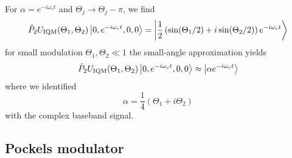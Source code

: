 For $\alpha=e^{-i\omega_ct}$ and $\Theta_j\to\Theta_j-\pi$, we find
\begin{equation}
	\hat{P}_2
	U_\text{IQM}(\Theta_1,\Theta_2)
	\ket{0,e^{-i\omega_ct},0,0}
	=
	\ket{\frac{1}{2}\left(\sin(\Theta_1/2)+i\sin(\Theta_2/2)\right)e^{-i\omega_ct}}
\end{equation}
for small modulation $\Theta_1,\Theta_2\ll1$ the small-angle approximation yields
\begin{equation}
	\hat{P}_2
	U_\text{IQM}(\Theta_1,\Theta_2)
	\ket{0,e^{-i\omega_ct},0,0}
	\approx
	\ket{\alpha e^{-i\omega_ct}}
\end{equation}
where we identified
\begin{equation}
	\alpha
	=
	\frac{1}{4}
	\left(\Theta_1+i\Theta_2\right)
\end{equation}
with the complex baseband signal.


\subsection{Pockels modulator}


